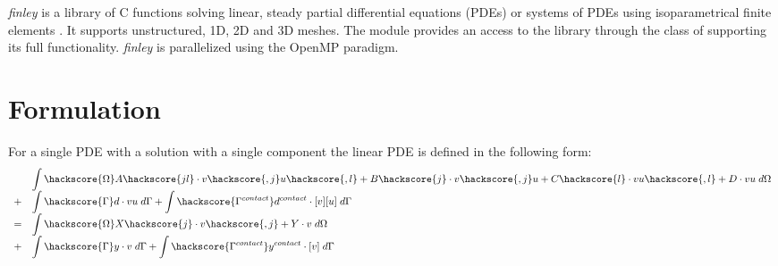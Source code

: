  

{\it finley} is a library of C functions solving linear, steady partial differential equations
 (PDEs) or systems of PDEs using isoparametrical finite 
elements .
It supports unstructured, 1D, 2D and 3D meshes. The module \finley provides an access to the
library through the \LinearPDE class of \escript supporting its full functionality. {\it finley} 
is parallelized using the OpenMP  paradigm. 

\section{Formulation}

For a single PDE with a solution with a single component the linear PDE is defined in the
following form:
\begin{equation}\label{FINLEY.SINGLE.1}
\begin{array}{cl} &
\displaystyle{
\int\hackscore{\Omega} 
A\hackscore{jl} \cdot v\hackscore{,j}u\hackscore{,l}+ B\hackscore{j} \cdot v\hackscore{,j} u+ C\hackscore{l} \cdot v u\hackscore{,l}+D \cdot vu \; d\Omega }  \\
+ & \displaystyle{\int\hackscore{\Gamma} d \cdot vu \; d{\Gamma} } 
+  \displaystyle{\int\hackscore{\Gamma^{contact}} d^{contact} \cdot [v][u] \; d{\Gamma} } \\
= & \displaystyle{\int\hackscore{\Omega}  X\hackscore{j} \cdot v\hackscore{,j}+ Y \cdot v \; d\Omega }\\ 
+ & \displaystyle{\int\hackscore{\Gamma} y \cdot v \; d{\Gamma}}  + 
\displaystyle{\int\hackscore{\Gamma^{contact}} y^{contact}\cdot [v] \; d{\Gamma}} \\
\end{array}
\end{equation}

